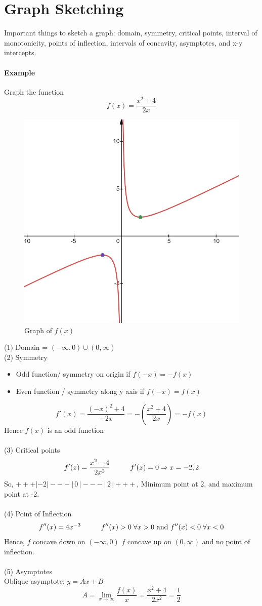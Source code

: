\documentclass[12pt]{article}
\newcommand\tab[1][1cm]{\hspace*{#1}}
\begin{document}
\section{Graph Sketching}
Important things to sketch a graph: domain, symmetry, critical points, interval of monotonicity, points of inflection,
intervals of concavity, asymptotes, and x-y intercepts.

\paragraph{Example} Graph the function
\[
    f(x) = \frac{x^2 + 4}{2x} 
\]
\begin{figure}[h!]
    \centering
    \includegraphics[width = 0.5\linewidth]{Images/graph sketching example.png}
    \caption{Graph of $f(x)$}
\end{figure}

(1) Domain = $(-\infty, 0) \cup (0, \infty)$ \\
(2) Symmetry \\
\begin{itemize} 
     \item Odd function/ symmetry on origin if $f(-x) = - f(x)$
     \item Even function / symmetry along y axis if $f(-x) = f(x)$
\end{itemize}

\[
    f'(x) = \frac{( - x)^2 + 4}{ - 2x} = - (\frac{x^2 + 4}{2x}) = - f(x) 
\]
Hence $f(x)$ is an odd function \\ \\
(3) Critical points
\[
    f'(x) = \frac{x^2 - 4}{2x^2} \textrm{\tab} f'(x) = 0 \Rightarrow x = {-2, 2} 
\]
So, $+++|-2|---|\,0\,|---|\,2\,|+++$, 
Minimum point at 2, and maximum point at -2. \\ \\
(4) Point of Inflection
\[
    f''(x) = 4x^{ - 3} \textrm{\tab} f''(x) > 0 \; \forall x > 0 \textrm{ and } f''(x) < 0 \; \forall x < 0
\]
Hence, $f$ concave down on $(- \infty, 0)$  $f$ concave up on $(0, \infty)$ and no point of inflection. \\ \\
(5) Asymptotes \\
Oblique asymptote: $y = Ax + B$
\[
    A = \lim_{x \to \infty} \frac{f(x)}{x} = \frac{x^2 + 4}{2x^2} = \frac{1}{2} 
\]
\end{document}
